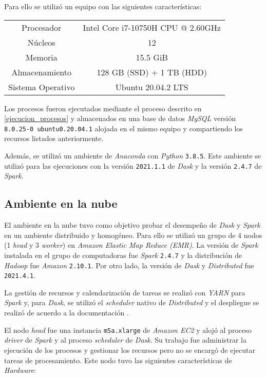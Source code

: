 Para ello se utilizó un equipo con las siguientes características:

\begin{center}
\begin{tabular}{|c|c|}
 \hline
  Procesador & Intel Core i7-10750H CPU @ 2.60GHz \\ 
  Núcleos & 12 \\
  Memoria & 15.5 GiB \\ 
  Almacenamiento & 128 GB (SSD) + 1 TB (HDD) \\ 
  Sistema Operativo & Ubuntu 20.04.2 LTS \\
  \hline
\end{tabular}
\end{center}

Los procesos fueron ejecutados mediante el proceso descrito en \ref{ejecucion_procesos} y almacenados en una base de datos \textit{MySQL} versión \texttt{8.0.25-0 ubuntu0.20.04.1} alojada en el mismo equipo y compartiendo los recursos listados anteriormente.

Además, se utilizó un ambiente de \textit{Anaconda} con \textit{Python} \texttt{3.8.5}. Este ambiente se utilizó para las ejecuciones con la versión  \texttt{2021.1.1} de \textit{Dask} y la versión \texttt{2.4.7} de \textit{Spark}. 

\subsection{Ambiente en la nube}

El ambiente en la nube tuvo como objetivo probar el desempeño de \textit{Dask} y \textit{Spark} en un ambiente distribuido y homogéneo. Para ello se utilizó un grupo de 4 nodos (1 \textit{head} y 3 \textit{worker}) en \textit{Amazon Elastic Map Reduce (EMR)}. La versión de \textit{Spark} instalada en el grupo de computadoras fue \textit{Spark} \texttt{2.4.7} y la distribución de \textit{Hadoop} fue \textit{Amazon} \texttt{2.10.1}. Por otro lado, la versión de \textit{Dask} y \textit{Distributed} fue \texttt{2021.4.1}. 


La gestión de recursos y calendarización de tareas se realizó con \textit{YARN} para \textit{Spark} y, para \textit{Dask}, se utilizó el \textit{scheduler} nativo de \textit{Distributed} y el despliegue se realizó de acuerdo a la documentación \cite{daskdistributedsetup}.

El nodo \textit{head} fue una instancia \texttt{m5a.xlarge} de \textit{Amazon EC2} y alojó al proceso \textit{driver} de \textit{Spark} y al proceso \textit{scheduler} de \textit{Dask}. Su trabajo fue administrar la ejecución de los procesos y gestionar los recursos pero no se encargó de ejecutar tareas de procesamiento. Este nodo tuvo las siguientes características de \textit{Hardware}:

